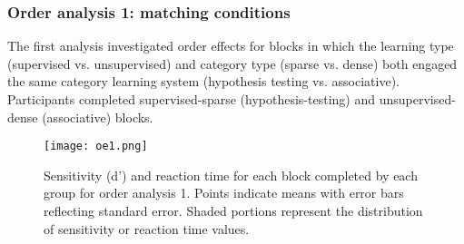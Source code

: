 \documentclass[../dissertation.tex]{subfiles}
\begin{document}
		
\subsubsection{Order analysis 1: matching conditions}
	The first analysis investigated order effects for blocks in which the learning type (supervised vs. unsupervised) and category type (sparse vs. dense) both engaged the same category learning system (hypothesis testing vs. associative). Participants completed supervised-sparse (hypothesis-testing) and unsupervised-dense (associative) blocks.  \par

\begin{wrapfigure}{R}{0.55\textwidth}
\vspace{-10pt}
\texttt{[image: oe1.png]}
\caption[Sensitivity and reaction time for order analysis 1]{Sensitivity (d')  and reaction time for each block completed by each group for order analysis 1. Points indicate means with error bars reflecting standard error. Shaded portions represent the distribution of sensitivity or reaction time values.}
\label{oe1}
\vspace{-20pt}
\end{wrapfigure}		
	
\end{document}
